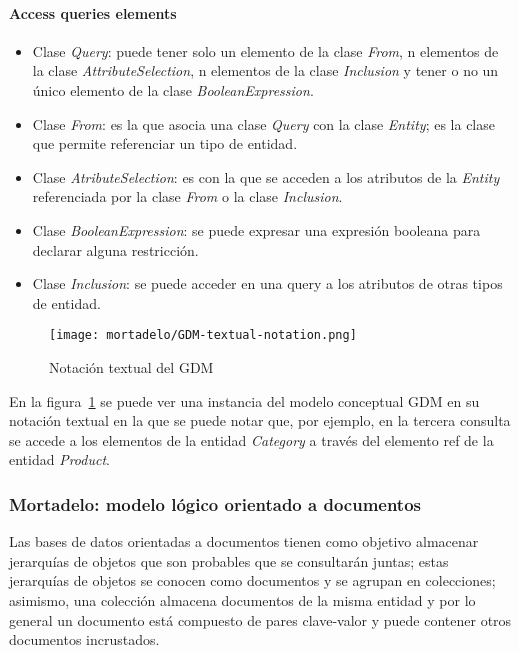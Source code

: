 \paragraph*{Access queries elements}


\begin{itemize}
    
    \item Clase \textit{Query}: puede tener solo un elemento de la clase \textit{From}, n elementos de la clase \textit{AttributeSelection}, n elementos de la clase \textit{Inclusion} y tener o no un único elemento de la clase \textit{BooleanExpression}.
    \item Clase \textit{From}: es la que asocia una clase \textit{Query} con la clase \textit{Entity}; es la clase que permite referenciar un tipo de entidad.
    \item Clase \textit{AtributeSelection}: es con la que se acceden a los atributos de la \textit{Entity} referenciada por la clase \textit{From} o la clase \textit{Inclusion}.
    \item Clase \textit{BooleanExpression}: se puede expresar una expresión booleana para declarar alguna restricción.
    \item Clase \textit{Inclusion}: se puede acceder en una query a los atributos de otras tipos de entidad.
    
\end{itemize}

\begin{figure}[h!t] 
    \centering
    \texttt{[image: mortadelo/GDM-textual-notation.png]}
    \caption{Notación textual del GDM}
    \label{img:mortadelo-gdm.textual.notation}
\end{figure}

En la figura~\ref{img:mortadelo-gdm.textual.notation} se puede ver una instancia del modelo conceptual GDM en su notación textual en la que se puede notar que, por ejemplo, en la tercera consulta se accede a los elementos de la entidad \textit{Category} a través del elemento ref de la entidad \textit{Product}.


\subsubsection*{Mortadelo: modelo lógico orientado a documentos}

Las bases de datos orientadas a documentos tienen como objetivo almacenar jerarquías de objetos que son probables que se consultarán juntas; estas jerarquías de objetos se conocen como documentos y se agrupan en colecciones; asimismo, una colección almacena documentos de la misma entidad y por lo general un documento está compuesto de pares clave-valor y puede contener otros documentos incrustados.


